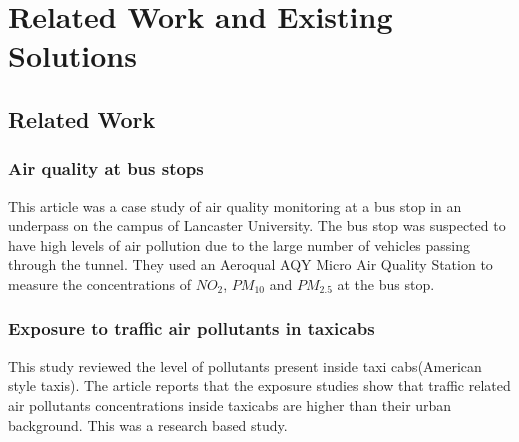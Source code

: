 \section{Related Work and Existing Solutions}
\subsection{Related Work}

\subsubsection{Air quality at bus stops \cite{busstop}}
This article was a case study of air quality monitoring at a bus stop in an underpass on the campus of Lancaster University. The bus stop was suspected to have high levels of air pollution due to the large number of vehicles passing through the tunnel. They used an Aeroqual AQY Micro Air Quality Station to measure the concentrations of $NO_2$, $PM_{10}$ and $PM_{2.5}$ at the bus stop. 



\subsubsection{Exposure to traffic air pollutants in taxicabs \cite{insidetaxismall}}
This study reviewed the level of pollutants present inside taxi cabs(American style taxis). The article reports that the exposure studies show that traffic related air pollutants concentrations inside taxicabs are higher than their urban background. This was a research based study.


